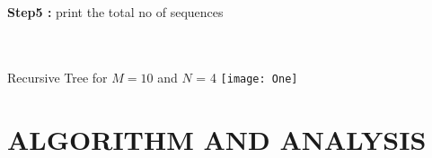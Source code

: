 \documentclass[conference]{IEEEtran}
\begin{document}
\\\\\textbf{Step5 :}
print the total no of sequences 

\graphicspath{ {./images/} }
\\\\Recursive Tree for \begin{math}M=10\end{math} and \begin{math}N\end{math} = 4
\texttt{[image: One]}



\section{ALGORITHM AND ANALYSIS}\\
\end{document}
